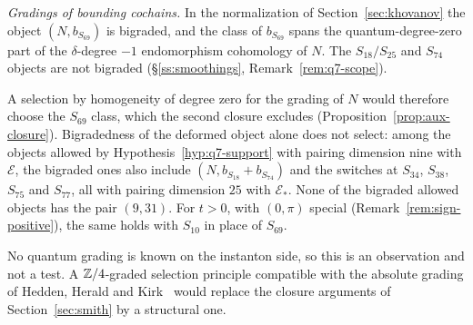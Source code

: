 \emph{Gradings of bounding cochains.}  In the normalization of Section~\ref{sec:khovanov} the object
$(N,b_{S_{69}})$ is bigraded, and the class of $b_{S_{69}}$ spans the quantum-degree-zero part of the
$\delta$-degree $-1$ endomorphism cohomology of $N$.  The $S_{18}/S_{25}$ and $S_{74}$ objects are not
bigraded (\S\ref{ss:smoothings}, Remark~\ref{rem:q7-scope}).

A selection by homogeneity of degree zero for the grading of $N$ would therefore choose the $S_{69}$ class, which the second closure excludes (Proposition~\ref{prop:aux-closure}).  Bigradedness of the deformed object alone does not select: among the objects allowed by Hypothesis~\ref{hyp:q7-support} with pairing dimension nine with $\mathcal E$, the bigraded ones also include $(N,b_{S_{18}}+b_{S_{74}})$ and the switches at $S_{34}$, $S_{38}$, $S_{75}$ and $S_{77}$, all with pairing dimension $25$ with $\mathcal E_*$.  None of the bigraded allowed objects has the pair $(9,31)$.  For $t>0$, with $(0,\pi)$ special (Remark~\ref{rem:sign-positive}), the same holds with $S_{10}$ in place of $S_{69}$.

No quantum grading is known on the instanton side, so this is an observation and not a test.  A
$\mathbb{Z}/4$-graded selection principle compatible with the absolute grading of Hedden, Herald and
Kirk~\cite[\S6.1]{HHK2} would replace the closure arguments of Section~\ref{sec:smith} by a structural one.

